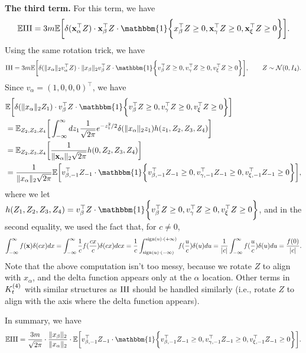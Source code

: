 {\bf The third term.} For this term, we have
\[
	\bbE \RN{3} = 3m \bbE \bigg[\delta(\rvx_\alpha^\top Z)\cdot\rvx_\beta^\top Z \cdot \mathbbm{1}\bigg\{x_\beta^\top Z \geq 0,\rvx_\gamma^\top Z \geq 0,\rvx_\xi^\top Z \geq 0\bigg\}\bigg].
\]
Using the same rotation trick, we have
\[
	\RN{3} = 3m \bbE\bigg[ \delta(\|x_\alpha\|_2 v_\alpha^\top Z ) \cdot \|x_\beta \|_2 v_\beta^\top Z \cdot \mathbbm{1}\bigg\{ v_\beta^\top Z \geq 0, v_\gamma^\top Z \geq 0, v_\xi^\top Z \geq 0  \bigg\} \bigg] ,\qquad Z\sim\calN(0, I_4).
\]
Since $v_\alpha = (1, 0, 0, 0)^\top$, we have
\begin{align*}
	& \bbE \bigg[\delta(\|x_\alpha \|_2 Z_1) \cdot v_\beta^\top Z \cdot \mathbbm{1}\bigg\{ v_\beta^\top Z\geq 0, v_\gamma^\top Z \geq 0, v_\xi^\top Z \geq 0\bigg\}\bigg] \\
	& = \bbE_{Z_2, Z_3, Z_4} \bigg[ \int_{-\infty}^\infty dz_1 \frac{1}{\sqrt{2\pi}} e^{-z_1^2/2} \delta(\|x_\alpha \|_2 z_1) h(z_1, Z_2, Z_3, Z_4) \bigg] \\
	& = \bbE_{Z_2, Z_3, Z_4} \bigg[ \frac{1}{\|\rvx_\alpha\|_2\sqrt{2\pi}} h(0, Z_2, Z_3, Z_4) \bigg] \\
	& = \frac{1}{\|x_\alpha\|_2\sqrt{2\pi}} \bbE\bigg[ v_{\beta, -1}^\top Z_{-1}\cdot \mathbbm{1}\bigg\{ v_{\beta, -1}^\top Z_{-1} \geq 0, v_{\gamma, -1}^\top Z_{-1}\geq 0, v_{\xi, -1}^\top Z_{-1}\geq 0 \bigg\}\bigg],
\end{align*}
where we let $h(Z_1, Z_2, Z_3, Z_4) =  v_\beta^\top Z \cdot \mathbbm{1}\bigg\{ v_\beta^\top Z\geq 0, v_\gamma^\top Z \geq 0, v_\xi^\top Z \geq 0\bigg\}$, and in the second equality, we used the fact that, for $c\neq 0$,
\[
	\int_{-\infty}^{\infty} f({\mathbf{x}} )\delta(cx) dx = \int_{-\infty}^\infty \frac{1}{c} f(\frac{cx}{c}) \delta(cx) d cx = \frac{1}{c} \int_{\textnormal{sign}(u)\cdot (-\infty)}^{\textnormal{sign}(u)\cdot (+ \infty)} f(\frac{u}{c})\delta(u) du  = \frac{1}{|c|} \int_{-\infty}^\infty f(\frac{u}{c}) \delta(u) du = \frac{f(0)}{|c|}.
\]
Note that the above computation isn't too messy, because we rotate $Z$ to align with $x_\alpha$, and the delta function appears only at the $\alpha$ location. Other terms in ${K}^{(4)}_t$ with similar structures as $\RN{3}$ should be handled similarly (i.e., rotate $Z$ to align with the axis where the delta function appears).

In summary, we have
\[
	\bbE \RN{3} = \frac{3m}{  \sqrt{2\pi}} \cdot \frac{\|x_\beta\|_2}{\|x_\alpha \|_2} \cdot \bbE\bigg[ v_{\beta, -1}^\top Z_{-1} \cdot \mathbbm{1}\bigg\{ v_{\beta, -1}^\top Z_{-1} \geq 0, v_{\gamma, -1}^\top Z_{-1}\geq 0, v_{\xi, -1}^\top Z_{-1}\geq 0 \bigg\}\bigg].
\]

